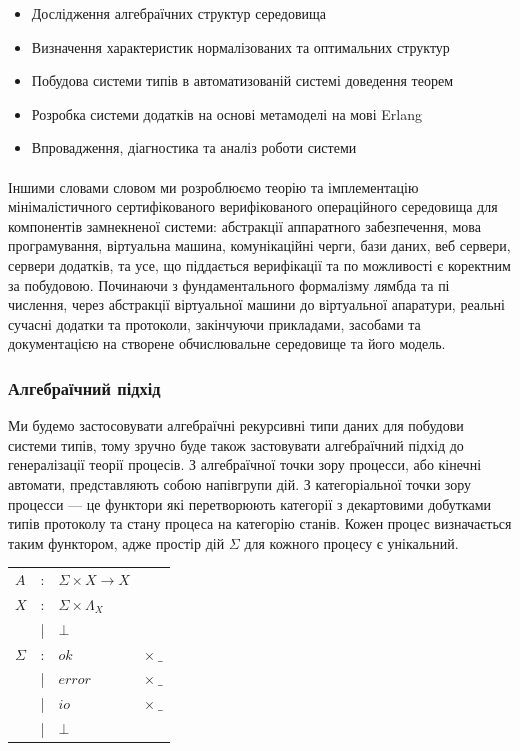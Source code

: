 \documentclass[11pt,oneside]{article}
\begin{document}
\begin{itemize}
   \item Дослідження алгебраїчних структур середовища
   \item Визначення характеристик нормалізованих та оптимальних структур
   \item Побудова системи типів в автоматизованій системі доведення теорем
   \item Розробка системи додатків на основі метамоделі на мові Erlang
   \item Впровадження, діагностика та аналіз роботи системи
\end{itemize}

   \paragraph{}
   Іншими словами словом ми розроблюємо теорію та імплементацію мінімалістичного
   сертифікованого верифікованого операційного середовища для компонентів замнекненої системи:
   абстракції аппаратного забезпечення, мова програмування, віртуальна машина, комунікаційні
   черги, бази даних, веб сервери, сервери додатків, та усе, що піддається верифікації та по
   можливості є коректним за побудовою. Починаючи з фундаментального формалізму лямбда та пі числення,
   через абстракції віртуальної машини до віртуальної апаратури, реальні сучасні додатки та протоколи,
   закінчуючи прикладами, засобами та документацією на створене обчислювальне середовище та його модель.\\

\newpage
   \subsubsection*{Алгебраїчний підхід}

   Ми будемо застосовувати алгебраїчні рекурсивні типи даних для побудови системи типів, тому
   зручно буде також застовувати алгебраїчний підхід до генералізації теорії процесів.
   З алгебраїчної точки зору процесси, або кінечні автомати, представляють собою напівгрупи дій.
   З категоріальної точки зору процесси --- це функтори які перетворюють категорії з декартовими добутками
   типів протоколу та стану процеса на категорію станів. Кожен процес визначається таким функтором, адже
   простір дій $\Sigma$ для кожного процесу є унікальний.

\begin{center}
\begin{tabular}{lcll}
$A$         &:& $\Sigma \times X \rightarrow X  $ &\\
$X$         &:& $\Sigma \times \Lambda_{X} $ &\\
            &|& $\bot                              $ &\\
$\Sigma$    &:& $ok$    & $\times\ \_$          \\
            &|& $error$ & $\times\ \_$          \\
            &|& $io$    & $\times\ \_$          \\
            &|& $\bot                              $ &\\
\end{tabular}
\end{center}
\end{document}
